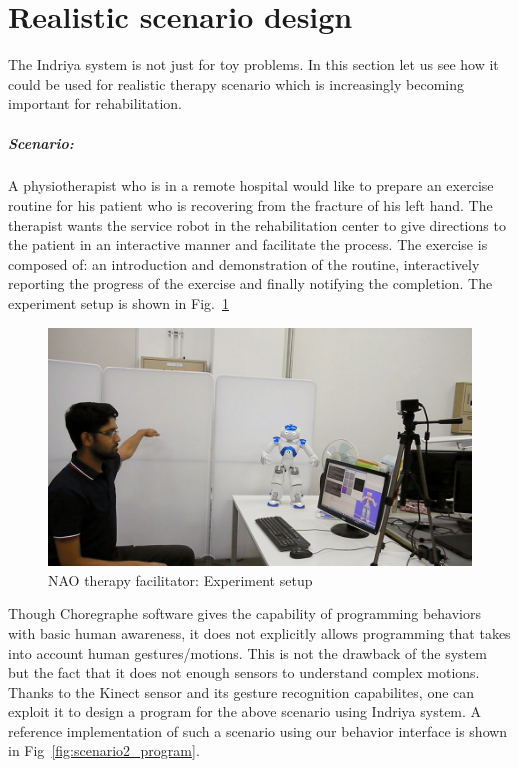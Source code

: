\section{Realistic scenario design}
The Indriya system is not just for toy problems. In this section let us see how it could be used for realistic therapy scenario which is increasingly becoming important for rehabilitation. 
\subparagraph{Scenario:}A physiotherapist who is in a remote hospital would like to prepare an exercise routine for his patient who is recovering from the fracture of his left hand. The therapist wants the service robot in the rehabilitation center to give directions to the patient in an interactive manner and facilitate the process. The exercise is composed of: an introduction and demonstration of the routine, interactively reporting the progress of the exercise and finally notifying the completion. The experiment setup is shown in Fig.~\ref{fig:scenario2_setup}
\begin{figure}[H]
\centering
\includegraphics[width=\textwidth]{../thesis/assets/scenario_therapy.png}
\caption[NAO therapy facilitator: Experiment setup]{NAO therapy facilitator: Experiment setup}
\label{fig:scenario2_setup}
\end{figure}
Though Choregraphe software gives the capability of programming behaviors with basic human awareness, it does not explicitly allows programming that takes into account human gestures/motions. This is not the drawback of the system but the fact that it does not enough sensors to understand complex motions. Thanks to the Kinect sensor and its gesture recognition capabilites, one can exploit it to design a program for the above scenario using Indriya system. A reference implementation of such a scenario using our behavior interface is shown in Fig~\ref{fig:scenario2_program}.
